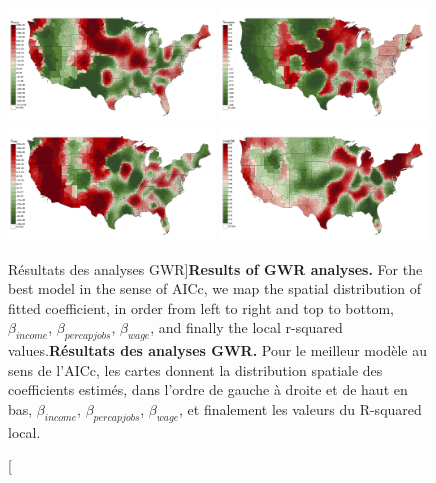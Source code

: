 \begin{figure}
\centering
\includegraphics[width=0.49\textwidth]{Figures/EnergyPrice/gwr_allbest_betaincome}
\includegraphics[width=0.49\textwidth]{Figures/EnergyPrice/gwr_allbest_betapercapjobs}\\
\includegraphics[width=0.49\textwidth]{Figures/EnergyPrice/gwr_allbest_wage}
\includegraphics[width=0.49\textwidth]{Figures/EnergyPrice/gwr_allbest_LocalR2}
\caption[Results of GWR analyses][Résultats des analyses GWR]{\textbf{Results of GWR analyses.} For the best model in the sense of AICc, we map the spatial distribution of fitted coefficient, in order from left to right and top to bottom, $\beta_{income}$, $\beta_{percapjobs}$, $\beta_{wage}$, and finally the local r-squared values.}{\textbf{Résultats des analyses GWR.} Pour le meilleur modèle au sens de l'AICc, les cartes donnent la distribution spatiale des coefficients estimés, dans l'ordre de gauche à droite et de haut en bas, $\beta_{income}$, $\beta_{percapjobs}$, $\beta_{wage}$, et finalement les valeurs du R-squared local.}
\label{fig:gwr}
\end{figure}

